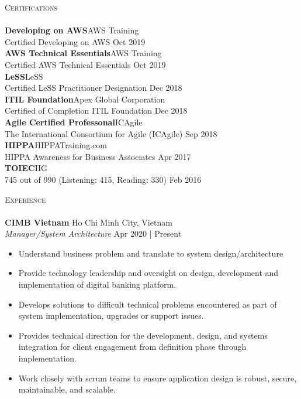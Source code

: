 \documentclass[a4paper]{article}
\newcommand{\lineunder} {
    \vspace*{-8pt} \\
    \hspace*{-18pt} \hrulefill \\
}
\newcommand{\header} [1] {
    {\hspace*{-18pt}\vspace*{6pt} \textsc{#1}}
    \vspace*{-6pt} \lineunder
}
\begin{document}
\header{Certifications}
\textbf{Developing on AWS}\hfill AWS Training\\
Certified Developing on AWS \hfill Oct 2019\\
\vspace{2mm}
\textbf{AWS Technical Essentials}\hfill AWS Training\\
Certified AWS Technical Essentials \hfill Oct 2019\\
\vspace{2mm}
\textbf{LeSS}\hfill LeSS\\
Certified LeSS Practitioner Designation \hfill Dec 2018\\
\vspace{2mm}
\textbf{ITIL Foundation}\hfill Apex Global Corporation\\
Certified of Completion ITIL Foundation \hfill Dec 2018\\
\vspace{2mm}
\textbf{Agile Certified Professonal}\hfill ICAgile\\
The International Consortium for Agile (ICAgile) \hfill Sep 2018\\
\vspace{2mm}
\textbf{HIPPA}\hfill HIPPATraining.com\\
HIPPA Awareness for Business Associates \hfill Apr 2017\\
\vspace{2mm}
\textbf{TOIEC}\hfill IIG\\
745 out of 990 (Listening: 415, Reading: 330) \hfill Feb 2016\\
\vspace{2mm}

\newpage

\header{Experience}
\vspace{1mm}
\textbf{CIMB Vietnam} \hfill Ho Chi Minh City, Vietnam\\
\textit{Manager/System Architecture} \hfill Apr 2020 | Present\\
\vspace{-1mm}
\begin{itemize} \itemsep 1pt
	\item Understand business problem and translate to system design/architecture
	\item Provide technology leadership and oversight on design, development and implementation of digital banking platform.
	\item Develops solutions to difficult technical problems encountered as part of system implementation, upgrades or support issues.
	\item Provides technical direction for the development, design, and systems integration for client engagement from definition phase through implementation.
	\item Work closely with scrum teams to ensure application design is robust, secure, maintainable, and scalable.
\end{itemize}
\end{document}
